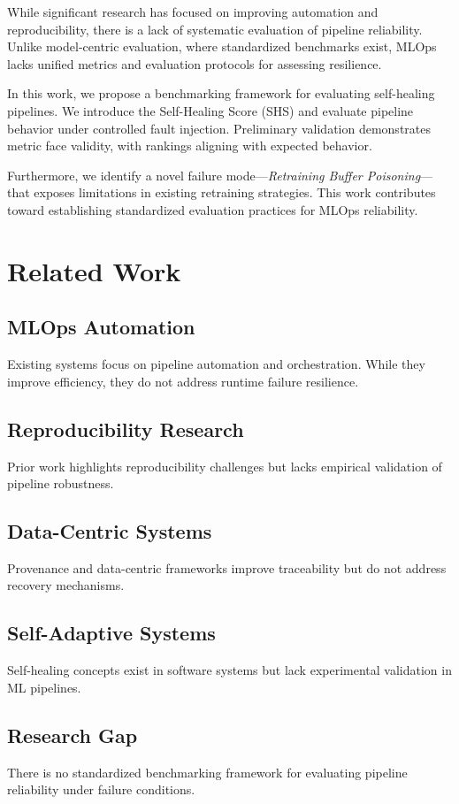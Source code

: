 \documentclass[conference]{IEEEtran}
\begin{document}
While significant research has focused on improving automation and reproducibility, there is a lack of systematic evaluation of pipeline reliability. Unlike model-centric evaluation, where standardized benchmarks exist, MLOps lacks unified metrics and evaluation protocols for assessing resilience.

In this work, we propose a benchmarking framework for evaluating self-healing pipelines. We introduce the Self-Healing Score (SHS) and evaluate pipeline behavior under controlled fault injection. Preliminary validation demonstrates metric face validity, with rankings aligning with expected behavior.

Furthermore, we identify a novel failure mode—\textit{Retraining Buffer Poisoning}—that exposes limitations in existing retraining strategies. This work contributes toward establishing standardized evaluation practices for MLOps reliability.

\section{Related Work}

\subsection{MLOps Automation}
Existing systems focus on pipeline automation and orchestration. While they improve efficiency, they do not address runtime failure resilience.

\subsection{Reproducibility Research}
Prior work highlights reproducibility challenges but lacks empirical validation of pipeline robustness.

\subsection{Data-Centric Systems}
Provenance and data-centric frameworks improve traceability but do not address recovery mechanisms.

\subsection{Self-Adaptive Systems}
Self-healing concepts exist in software systems but lack experimental validation in ML pipelines.

\subsection{Research Gap}
There is no standardized benchmarking framework for evaluating pipeline reliability under failure conditions.
\end{document}
